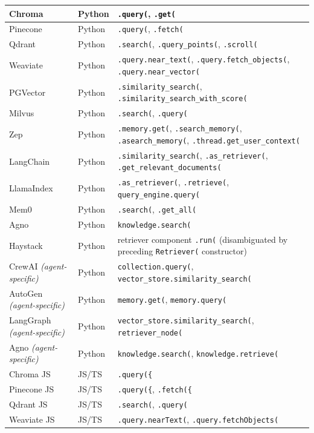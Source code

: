 {\begin{longtable}{@{}p{}p{}p{}@{}}
Chroma & Python & \texttt{.query(}, \texttt{.get(} \\ \midrule
Pinecone & Python & \texttt{.query(}, \texttt{.fetch(} \\ \midrule
Qdrant & Python & \texttt{.search(}, \texttt{.query\_points(}, \texttt{.scroll(} \\ \midrule
Weaviate & Python & \texttt{.query.near\_text(}, \texttt{.query.fetch\_objects(}, \texttt{.query.near\_vector(} \\ \midrule
PGVector & Python & \texttt{.similarity\_search(}, \texttt{.similarity\_search\_with\_score(} \\ \midrule
Milvus & Python & \texttt{.search(}, \texttt{.query(} \\ \midrule
Zep & Python & \texttt{.memory.get(}, \texttt{.search\_memory(}, \texttt{.asearch\_memory(}, \texttt{.thread.get\_user\_context(} \\ \midrule
LangChain & Python & \texttt{.similarity\_search(}, \texttt{.as\_retriever(}, \texttt{.get\_relevant\_documents(} \\ \midrule
LlamaIndex & Python & \texttt{.as\_retriever(}, \texttt{.retrieve(}, \texttt{query\_engine.query(} \\ \midrule
Mem0 & Python & \texttt{.search(}, \texttt{.get\_all(} \\ \midrule
Agno & Python & \texttt{knowledge.search(} \\ \midrule
Haystack & Python & retriever component \texttt{.run(} (disambiguated by preceding \texttt{Retriever(} constructor) \\ \midrule
CrewAI \textit{(agent-specific)} & Python & \texttt{collection.query(}, \texttt{vector\_store.similarity\_search(} \\ \midrule
AutoGen \textit{(agent-specific)} & Python & \texttt{memory.get(}, \texttt{memory.query(} \\ \midrule
LangGraph \textit{(agent-specific)} & Python & \texttt{vector\_store.similarity\_search(}, \texttt{retriever\_node(} \\ \midrule
Agno \textit{(agent-specific)} & Python & \texttt{knowledge.search(}, \texttt{knowledge.retrieve(} \\ \midrule
Chroma JS & JS/TS & \texttt{.query(\{} \\ \midrule
Pinecone JS & JS/TS & \texttt{.query(\{}, \texttt{.fetch(\{} \\ \midrule
Qdrant JS & JS/TS & \texttt{.search(}, \texttt{.query(} \\ \midrule
Weaviate JS & JS/TS & \texttt{.query.nearText(}, \texttt{.query.fetchObjects(} \\ \midrule

\end{longtable}}
